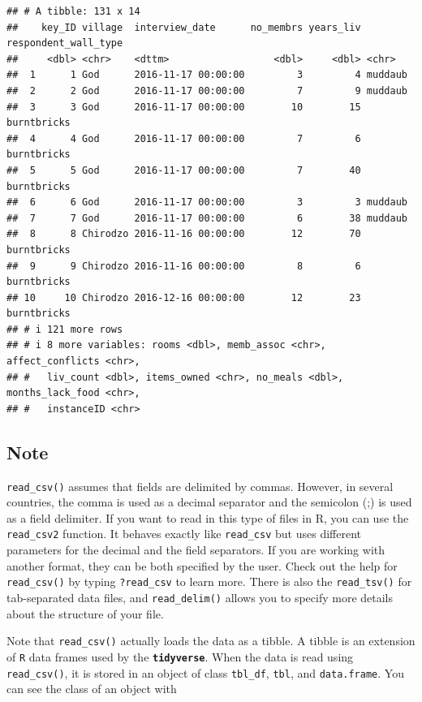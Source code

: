 \documentclass[
]{article}
\begin{document}
\begin{verbatim}
## # A tibble: 131 x 14
##    key_ID village  interview_date      no_membrs years_liv respondent_wall_type
##     <dbl> <chr>    <dttm>                  <dbl>     <dbl> <chr>               
##  1      1 God      2016-11-17 00:00:00         3         4 muddaub             
##  2      2 God      2016-11-17 00:00:00         7         9 muddaub             
##  3      3 God      2016-11-17 00:00:00        10        15 burntbricks         
##  4      4 God      2016-11-17 00:00:00         7         6 burntbricks         
##  5      5 God      2016-11-17 00:00:00         7        40 burntbricks         
##  6      6 God      2016-11-17 00:00:00         3         3 muddaub             
##  7      7 God      2016-11-17 00:00:00         6        38 muddaub             
##  8      8 Chirodzo 2016-11-16 00:00:00        12        70 burntbricks         
##  9      9 Chirodzo 2016-11-16 00:00:00         8         6 burntbricks         
## 10     10 Chirodzo 2016-12-16 00:00:00        12        23 burntbricks         
## # i 121 more rows
## # i 8 more variables: rooms <dbl>, memb_assoc <chr>, affect_conflicts <chr>,
## #   liv_count <dbl>, items_owned <chr>, no_meals <dbl>, months_lack_food <chr>,
## #   instanceID <chr>
\end{verbatim}

\subsection{Note}\label{note}

\texttt{read\_csv()} assumes that fields are delimited by commas.
However, in several countries, the comma is used as a decimal separator
and the semicolon (;) is used as a field delimiter. If you want to read
in this type of files in R, you can use the \texttt{read\_csv2}
function. It behaves exactly like \texttt{read\_csv} but uses different
parameters for the decimal and the field separators. If you are working
with another format, they can be both specified by the user. Check out
the help for \texttt{read\_csv()} by typing \texttt{?read\_csv} to learn
more. There is also the \texttt{read\_tsv()} for tab-separated data
files, and \texttt{read\_delim()} allows you to specify more details
about the structure of your file.

Note that \texttt{read\_csv()} actually loads the data as a tibble. A
tibble is an extension of \texttt{R} data frames used by the
\textbf{\texttt{tidyverse}}. When the data is read using
\texttt{read\_csv()}, it is stored in an object of class
\texttt{tbl\_df}, \texttt{tbl}, and \texttt{data.frame}. You can see the
class of an object with
\end{document}
